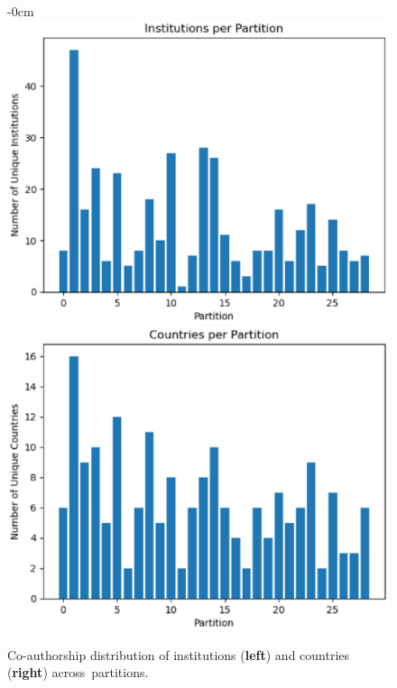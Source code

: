 \documentclass[jmse,review,accept,pdftex,moreauthors]{Definitions/mdpi}
\begin{document}
\begin{figure}[H]


\begin{adjustwidth}{-\extralength}{0cm}
\centering %
	\includegraphics[height=0.26\textheight, keepaspectratio]{pics/coauthorship_inst_per_partition.eps}
	\includegraphics[height=0.26\textheight, keepaspectratio]{pics/coauthorship_country_per_partition.eps}
\end{adjustwidth}
	\caption{Co-authorship distribution of institutions (\textbf{left}) and countries (\textbf{right}) across~partitions.}\label{fig:fig5}
\end{figure}
\end{document}
